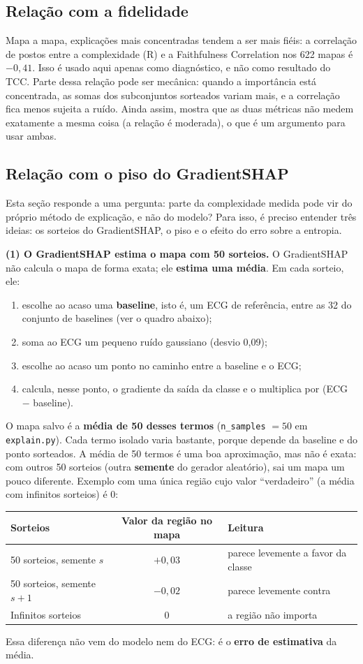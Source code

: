 \documentclass[11pt,a4paper]{article}
\begin{document}
\subsection{Relação com a fidelidade}
Mapa a mapa, explicações mais concentradas tendem a ser mais fiéis: a correlação de postos entre a complexidade (R) e a Faithfulness Correlation nos 622 mapas é $-0{,}41$. Isso é usado aqui apenas como diagnóstico, e não como resultado do TCC. Parte dessa relação pode ser mecânica: quando a importância está concentrada, as somas dos subconjuntos sorteados variam mais, e a correlação fica menos sujeita a ruído. Ainda assim, mostra que as duas métricas não medem exatamente a mesma coisa (a relação é moderada), o que é um argumento para usar ambas.

\subsection{Relação com o piso do GradientSHAP}\label{sec:piso}
Esta seção responde a uma pergunta: parte da complexidade medida pode vir do próprio método de explicação, e não do modelo? Para isso, é preciso entender três ideias: os sorteios do GradientSHAP, o piso e o efeito do erro sobre a entropia.

\textbf{(1) O GradientSHAP estima o mapa com 50 sorteios.} O GradientSHAP não calcula o mapa de forma exata; ele \textbf{estima uma média}. Em cada sorteio, ele:
\begin{enumerate}
\item escolhe ao acaso uma \textbf{baseline}, isto é, um ECG de referência, entre as 32 do conjunto de baselines (ver o quadro abaixo);
\item soma ao ECG um pequeno ruído gaussiano (desvio 0,09);
\item escolhe ao acaso um ponto no caminho entre a baseline e o ECG;
\item calcula, nesse ponto, o gradiente da saída da classe e o multiplica por (ECG $-$ baseline).
\end{enumerate}
O mapa salvo é a \textbf{média de 50 desses termos} (\texttt{n\_samples} $= 50$ em \texttt{explain.py}). Cada termo isolado varia bastante, porque depende da baseline e do ponto sorteados. A média de 50 termos é uma boa aproximação, mas não é exata: com outros 50 sorteios (outra \textbf{semente} do gerador aleatório), sai um mapa um pouco diferente. Exemplo com uma única região cujo valor “verdadeiro” (a média com infinitos sorteios) é 0:
\begin{center}\small
\begin{tabular}{lcl}
\toprule
\textbf{Sorteios} & \textbf{Valor da região no mapa} & \textbf{Leitura} \\
\midrule
50 sorteios, semente $s$ & $+0{,}03$ & parece levemente a favor da classe \\
50 sorteios, semente $s+1$ & $-0{,}02$ & parece levemente contra \\
Infinitos sorteios & $0$ & a região não importa \\
\bottomrule
\end{tabular}
\end{center}
Essa diferença não vem do modelo nem do ECG: é o \textbf{erro de estimativa} da média.
\end{document}

